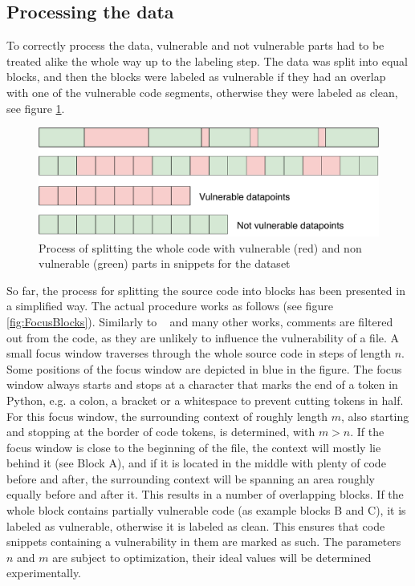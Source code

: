\documentclass[
	a4paper,
	pagesize,
	pdftex,
	12pt,
	twoside, %
	BCOR=5mm, %
	ngerman,
	fleqn,
	final,
	]{scrartcl}
\begin{document}
\subsection{Processing the data}\label{Processing}
To correctly process the data, vulnerable and not vulnerable parts had to be treated alike the whole way up to the labeling step. The data was split into equal blocks, and then the blocks were labeled as vulnerable if they had an overlap with one of the vulnerable code segments, otherwise they were labeled as clean, see figure \ref{fig:collectData2}.

\begin{figure}[ht]
	\centering
	\includegraphics[width=0.8\linewidth]{img/collectData2}
	\caption{Process of splitting the whole code with vulnerable (red) and non vulnerable (green) parts in snippets for the dataset}
	\label{fig:collectData2}
\end{figure}

So far, the process for splitting the source code into blocks has been presented in a simplified way. The actual procedure works as follows (see figure \ref{fig:FocusBlocks}).
Similarly to ~\cite{Hovsepyan.2012} and many other works, comments are filtered out from the code, as they are unlikely to influence the vulnerability of a file. A small focus window traverses through the whole source code in steps of length $n$. Some positions of the focus window are depicted in blue in the figure. The focus window always starts and stops at a character that marks the end of a token in Python, e.g. a colon, a bracket or a whitespace to prevent cutting tokens in half. For this focus window, the surrounding context of roughly length $m$, also starting and stopping at the border of code tokens, is determined, with $m > n$. If the focus window is close to the beginning of the file, the context will mostly lie behind it (see Block A), and if it is located in the middle with plenty of code before and after, the surrounding context will be spanning an area roughly equally before and after it. This results in a number of overlapping blocks. If the whole block contains partially vulnerable code (as example blocks B and C), it is labeled as vulnerable, otherwise it is labeled as clean. This ensures that code snippets containing a vulnerability in them are marked as such. The parameters $n$ and $m$ are subject to optimization, their ideal values will be determined experimentally.
\end{document}
